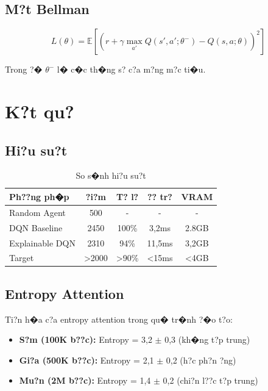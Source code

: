 \documentclass[11pt,a4paper]{article}
\begin{document}
\subsection{M?t Bellman}

\begin{equation}
L(\theta) = \mathbb{E}\left[\left(r + \gamma \max_{a'} Q(s', a'; \theta^-) - Q(s, a; \theta)\right)^2\right]
\end{equation}

Trong ?� $\theta^-$ l� c�c th�ng s? c?a m?ng m?c ti�u.

\section{K?t qu?}

\subsection{Hi?u su?t}

\begin{table}[H]
\centering
\small
\begin{tabular}{lcccc}
\toprule
\textbf{Ph??ng ph�p} & \textbf{?i?m} & \textbf{T? l?} & \textbf{?? tr?} & \textbf{VRAM} \\
\midrule
Random Agent & 500 & - & - & - \\
DQN Baseline & 2450 & 100\% & 3,2ms & 2.8GB \\
Explainable DQN & 2310 & 94\% & 11,5ms & 3,2GB \\
Target & >2000 & >90\% & <15ms & <4GB \\
\bottomrule
\end{tabular}
\caption{So s�nh hi?u su?t}
\end{table}

\subsection{Entropy Attention}

Ti?n h�a c?a entropy attention trong qu� tr�nh ?�o t?o:
\begin{itemize}
    \item \textbf{S?m (100K b??c):} Entropy = 3,2 $\pm$ 0,3 (kh�ng t?p trung)
    \item \textbf{Gi?a (500K b??c):} Entropy = 2,1 $\pm$ 0,2 (h?c ph?n ?ng)
    \item \textbf{Mu?n (2M b??c):} Entropy = 1,4 $\pm$ 0,2 (chi?n l??c t?p trung)
\end{itemize}
\end{document}
